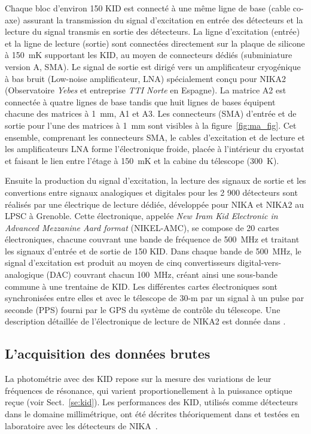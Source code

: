 Chaque bloc d'environ 150 KID est connecté à une même ligne de base
(cable co-axe) assurant la transmission du signal d'excitation en
entrée des détecteurs et la lecture du signal transmis en sortie des
détecteurs. La ligne d'excitation (entrée) et la ligne de lecture
(sortie) sont connectées directement sur la plaque de silicone à 150~mK
supportant les KID, au moyen de connecteurs dédiés (subminiature
version A, SMA). Le signal de sortie est dirigé vers un amplificateur
cryogénique à bas bruit (Low-noise amplificateur, LNA) spécialement
conçu pour NIKA2 (Observatoire \emph{Yebes} et entreprise \emph{TTI
  Norte} en Espagne). La matrice A2 est connectée à quatre lignes de
base tandis que huit lignes de bases équipent chacune des matrices à
1~mm, A1 et A3. Les connecteurs (SMA) d'entrée et de sortie pour l'une
des matrices à 1~mm sont visibles à la
figure~\ref{fig:ma_fig}. Cet ensemble, comprenant les connecteurs SMA,
le cables d'excitation et de lecture et les amplificateurs LNA forme
l'électronique froide, placée à l'intérieur du cryostat et faisant le
lien entre l'étage à 150~mK et la cabine du télescope (300~K).

Ensuite la production du signal d'excitation, la lecture des signaux
de sortie et les convertions entre signaux analogiques et digitales
pour les 2 900 détecteurs sont réalisés par une électrique de lecture
dédiée, développée pour NIKA et NIKA2 au LPSC à Grenoble. Cette
électronique, appelée \emph{New Iram Kid Electronic in Advanced
  Mezzanine Aard format} (NIKEL-AMC), se compose de 20 cartes
électroniques, chacune couvrant une bande de fréquence de 500~MHz et traitant
les signaux d'entrée et de sortie de 150 KID. Dans chaque bande de
500~MHz, le signal d'excitation est produit au moyen de cinq
convertisseurs digital-vers-analogique (DAC) couvrant chacun 100~MHz,
créant ainsi une sous-bande commune à une trentaine de KID.   
Les différentes cartes électroniques sont synchronisées entre elles et
avec le télescope de 30-m par un signal à un pulse par seconde (PPS)
fourni par le GPS du système de contrôle du télescope. Une description
détaillée de l'électronique de lecture de NIKA2 est donnée dans
\citet{Bourrion2012, Bourrion2016}.



\subsection{L'acquisition des données brutes}
\label{se:rawdata}

La photométrie avec des KID repose sur la mesure des variations de
leur fréquences de résonance, qui varient proportionellement à la
puissance optique reçue (voir Sect.~\ref{se:kid}). Les performances
des KID, utilisés comme détecteurs dans le domaine millimétrique, ont
été décrites théoriquement dans \citet{Swenson2010} et testées en
laboratoire avec les détecteurs de NIKA~\citep{Monfardini2014JLTP}. 

